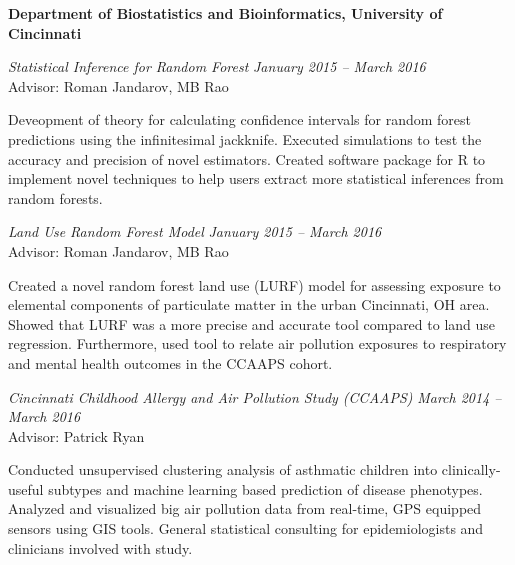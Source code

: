 \documentclass[margin,line]{res}
\newenvironment{list1}{
  \begin{list}{\ding{113}}{%
      \setlength{\itemsep}{0in}
      \setlength{\parsep}{0in} \setlength{\parskip}{0in}
      \setlength{\topsep}{0in} \setlength{\partopsep}{0in} 
      \setlength{\leftmargin}{0.17in}}}{\end{list}}
\begin{document}
\begin{resume}
\textbf{Department of Biostatistics and Bioinformatics, University of Cincinnati} \\

\vspace{-0.2in}

\textsl{Statistical Inference for Random Forest}
\hfill \textit{January 2015 -- March 2016} \\
Advisor: Roman Jandarov, MB Rao \\
\vspace{-0.13in}
\begin{list1}
\item[]Deveopment of theory for calculating confidence intervals for random forest predictions using the infinitesimal jackknife.  Executed simulations to test the accuracy and precision of novel estimators.  Created software package for R to implement novel techniques to help users extract more statistical inferences from random forests.
\end{list1}

\textsl{Land Use Random Forest Model}
\hfill \textit{January 2015 -- March 2016} \\
Advisor: Roman Jandarov, MB Rao \\
\vspace{-0.13in}
\begin{list1}
    \item[]Created a novel random forest land use (LURF) model for assessing exposure to elemental components of particulate matter in the urban Cincinnati, OH area.  Showed that LURF was a more precise and accurate tool compared to land use regression. Furthermore, used tool to relate air pollution exposures to respiratory and mental health outcomes in the CCAAPS cohort.
\end{list1}


\textsl{Cincinnati Childhood Allergy and Air Pollution Study (CCAAPS)}
\hfill \textit{March 2014 -- March 2016} \\
Advisor: Patrick Ryan \\
\vspace{-0.13in}
\begin{list1}
\item[]Conducted unsupervised clustering analysis of asthmatic children into clinically-useful subtypes and machine learning based prediction of disease phenotypes. Analyzed and visualized big air pollution data from real-time, GPS equipped sensors using GIS tools. General statistical consulting for epidemiologists and clinicians involved with study. 
\end{list1}



\end{resume}
\end{document}
